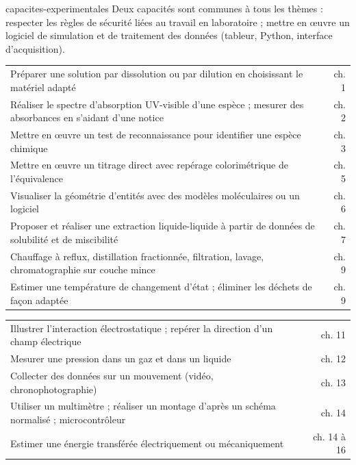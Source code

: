 \begin{blocEdition}{capacites-experimentales}
\fontsize{10}{13.5}\selectfont
Deux capacités sont communes à tous les thèmes : respecter les règles de sécurité liées au travail en laboratoire ; mettre
en œuvre un logiciel de simulation et de traitement des données (tableur, Python, interface d'acquisition).
\begin{tabularx}{\linewidth}{@{}Yr@{}}\toprule
Préparer une solution par dissolution ou par dilution en choisissant le matériel adapté & ch. 1 \\
Réaliser le spectre d'absorption UV-visible d'une espèce ; mesurer des absorbances en s'aidant d'une notice & ch. 2 \\
Mettre en œuvre un test de reconnaissance pour identifier une espèce chimique & ch. 3 \\
Mettre en œuvre un titrage direct avec repérage colorimétrique de l'équivalence & ch. 5 \\
Visualiser la géométrie d'entités avec des modèles moléculaires ou un logiciel & ch. 6 \\
Proposer et réaliser une extraction liquide-liquide à partir de données de solubilité et de miscibilité & ch. 7 \\
Chauffage à reflux, distillation fractionnée, filtration, lavage, chromatographie sur couche mince & ch. 9 \\
Estimer une température de changement d'état ; éliminer les déchets de façon adaptée & ch. 9 \\\bottomrule
\end{tabularx}
\begin{tabularx}{\linewidth}{@{}Yr@{}}\toprule
Illustrer l'interaction électrostatique ; repérer la direction d'un champ électrique & ch. 11 \\
Mesurer une pression dans un gaz et dans un liquide & ch. 12 \\
Collecter des données sur un mouvement (vidéo, chronophotographie) & ch. 13 \\
Utiliser un multimètre ; réaliser un montage d'après un schéma normalisé ; microcontrôleur & ch. 14 \\
Estimer une énergie transférée électriquement ou mécaniquement & ch. 14 à 16 \\

\end{tabularx}
\end{blocEdition}
